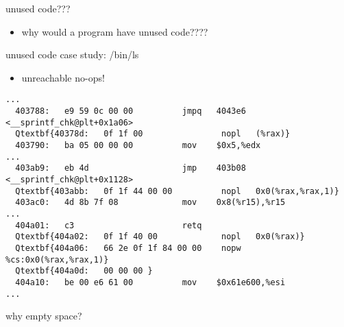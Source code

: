 \begin{frame}{unused code???}
    \begin{itemize}
    \item why would a program have unused code????
    \end{itemize}
\end{frame}

\begin{frame}[fragile,label=lsStudy1]{unused code case study: /bin/ls}
    \begin{itemize}
    \item unreachable no-ops!
    \end{itemize}
\begin{Verbatim}[fontsize=\fontsize{9}{10}\selectfont,commandchars=Q\{\}]
...
  403788:	e9 59 0c 00 00       	jmpq   4043e6 <__sprintf_chk@plt+0x1a06>
  Qtextbf{40378d:	0f 1f 00             	nopl   (%rax)}
  403790:	ba 05 00 00 00       	mov    $0x5,%edx
...
  403ab9:	eb 4d                	jmp    403b08 <__sprintf_chk@plt+0x1128>
  Qtextbf{403abb:	0f 1f 44 00 00       	nopl   0x0(%rax,%rax,1)}
  403ac0:	4d 8b 7f 08          	mov    0x8(%r15),%r15
...
  404a01:	c3                   	retq   
  Qtextbf{404a02:	0f 1f 40 00          	nopl   0x0(%rax)}
  Qtextbf{404a06:	66 2e 0f 1f 84 00 00 	nopw   %cs:0x0(%rax,%rax,1)}
  Qtextbf{404a0d:	00 00 00 }
  404a10:	be 00 e6 61 00       	mov    $0x61e600,%esi
...
\end{Verbatim}
\end{frame}

\begin{frame}{why empty space?}
\end{frame}

